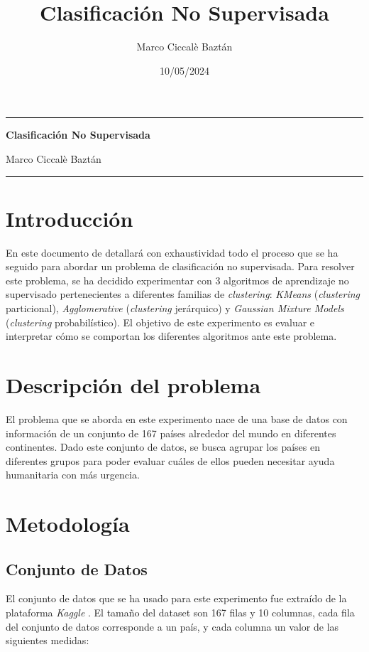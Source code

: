 \documentclass{article}
\title{Clasificación No Supervisada}
\author{Marco Ciccalè Baztán}
\date{10/05/2024}
\begin{document}
\begin{center}
\rule{\textwidth}{1pt}
{\huge \begin{center}\textbf{Clasificación No Supervisada}\end{center}}
\vspace*{.5cm}
{\LARGE Marco Ciccalè Baztán}
\rule{\textwidth}{1pt}
\end{center}

\section{Introducción}

\noindent En este documento de detallará con exhaustividad todo el proceso que se ha seguido para abordar un problema de clasificación no supervisada.
Para resolver este problema, se ha decidido experimentar con 3 algoritmos de aprendizaje no supervisado pertenecientes a diferentes familias de \textit{clustering}:
\textit{KMeans} (\textit{clustering} particional),
\textit{Agglomerative} (\textit{clustering} jerárquico) y
\textit{Gaussian Mixture Models} (\textit{clustering} probabilístico).
El objetivo de este experimento es evaluar e interpretar cómo se comportan los diferentes algoritmos ante este problema.

\section{Descripción del problema}

\noindent El problema que se aborda en este experimento nace de una base de datos con información de un conjunto de 167 países alrededor del mundo en diferentes continentes.
Dado este conjunto de datos, se busca agrupar los países en diferentes grupos para poder evaluar cuáles de ellos pueden necesitar ayuda humanitaria con más urgencia.

\section{Metodología}

\subsection{Conjunto de Datos}

\noindent El conjunto de datos que se ha usado para este experimento fue extraído de la plataforma \textit{Kaggle} \cite{dataset}.
El tamaño del dataset son 167 filas y 10 columnas,
cada fila del conjunto de datos corresponde a un país, y cada columna un valor de las siguientes medidas:
\end{document}
